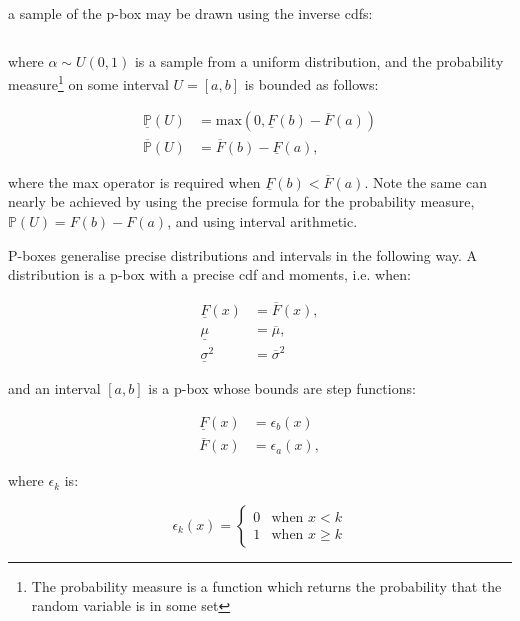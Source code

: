 \documentclass{juliacon}
\begin{document}
\noindent a sample of the p-box may be drawn using the inverse cdfs: 

\begin{equation*}
  [\overline{F}^{-1}(\alpha), \underline{F}^{-1}(\alpha)]
\end{equation*}

\noindent where $\alpha \sim U(0,1)$ is a sample from a uniform distribution, and the probability measure\footnote{The probability measure is a function which returns the probability that the random variable is in some set} on some interval $U = [a, b]$ is bounded as follows:

\begin{align*}
  \underline{\mathbb{P}}(U) &= \text{max}(0, \underline{F}(b) - \overline{F}(a)) \\ 
  \overline{\mathbb{P}}(U)  &= \overline{F}(b) - \underline{F}(a) ,
\end{align*}

where the max operator is required when $\underline{F}(b) < \overline{F}(a)$. Note the same can nearly be achieved by using the precise formula for the probability measure, $\mathbb{P}(U) = F(b)- F(a)$, and using interval arithmetic.


P-boxes generalise precise distributions and intervals in the following way. A distribution is a p-box with a precise cdf and moments, i.e. when: 

\begin{align*}
  \underline{F}(x) &= \overline{F}(x), \\ 
  \underline{\mu}  &= \overline{\mu}, \\ 
  \underline{\sigma}^2 &= \overline{\sigma}^2
\end{align*}

\noindent and an interval $[a,b]$ is a p-box whose bounds are step functions: 

\begin{align*}
    \underline{F}(x) &= \epsilon_{b}(x)\\
    \overline{F}(x) &= \epsilon_{a}(x) ,
\end{align*}

\noindent where $\epsilon_k$ is: 

\begin{equation*}
   \epsilon_k(x) = \begin{cases} 0 &\text{when } x < k \\ 1 &\text{when } x \geq k \end{cases}
\end{equation*}
\end{document}
